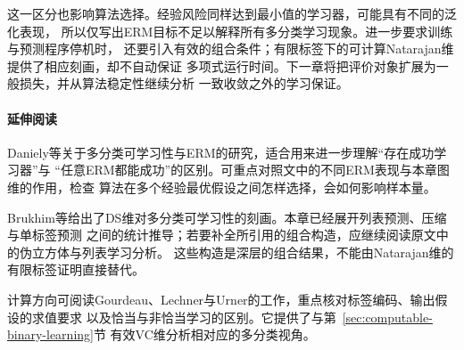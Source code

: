 这一区分也影响算法选择。经验风险同样达到最小值的学习器，可能具有不同的泛化表现，
所以仅写出ERM目标不足以解释所有多分类学习现象。进一步要求训练与预测程序停机时，
还要引入有效的组合条件；有限标签下的可计算Natarajan维提供了相应刻画，却不自动保证
多项式运行时间。下一章将把评价对象扩展为一般损失，并从算法稳定性继续分析
一致收敛之外的学习保证。

\paragraph{延伸阅读}
Daniely等关于多分类可学习性与ERM的研究，适合用来进一步理解“存在成功学习器”与
“任意ERM都能成功”的区别。可重点对照文中的不同ERM表现与本章图维的作用，检查
算法在多个经验最优假设之间怎样选择，会如何影响样本量。

Brukhim等给出了DS维对多分类可学习性的刻画。本章已经展开列表预测、压缩与单标签预测
之间的统计推导；若要补全所引用的组合构造，应继续阅读原文中的伪立方体与列表学习分析。
这些构造是深层的组合结果，不能由Natarajan维的有限标签证明直接替代。

计算方向可阅读Gourdeau、Lechner与Urner的工作，重点核对标签编码、输出假设的求值要求
以及恰当与非恰当学习的区别。它提供了与第~\ref{sec:computable-binary-learning}节
有效VC维分析相对应的多分类视角。
